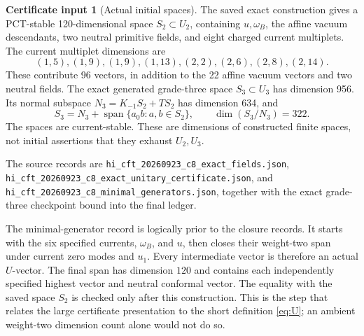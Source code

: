 \documentclass[11pt,a4paper]{article}
\theoremstyle{definition}
\newtheorem{certificate}[theorem]{Certificate input}
\DeclareMathOperator{\Span}{span}
\newcommand{\artifact}[1]{\textnormal{\nolinkurl{#1}}}
\begin{document}
\begin{certificate}[Actual initial spaces]\label{cert:initial}
The saved exact construction gives a PCT-stable 120-dimensional
space \(S_2\subset U_2\), containing \(u,\omega_B\), the affine
vacuum descendants, two neutral primitive fields, and eight charged
current multiplets. The current multiplet dimensions are
\[
 (1,5),(1,9),(1,9),(1,13),(2,2),(2,6),(2,8),(2,14).
\]
These contribute 96 vectors, in addition to the 22 affine vacuum
vectors and two neutral fields. The exact generated grade-three
space \(S_3\subset U_3\) has dimension 956. Its normal subspace
\(N_3=K_{-1}S_2+TS_2\) has dimension 634, and
\[
 S_3=N_3+\Span\{a_0b:a,b\in S_2\},\qquad \dim(S_3/N_3)=322.
\]
The spaces are current-stable. These are dimensions of constructed
finite spaces, not initial assertions that they exhaust \(U_2,U_3\).
\end{certificate}
The source records are
\artifact{hi_cft_20260923_c8_exact_fields.json},
\artifact{hi_cft_20260923_c8_exact_unitary_certificate.json}, and
\artifact{hi_cft_20260923_c8_minimal_generators.json}, together with
the exact grade-three checkpoint bound into the final ledger.

The minimal-generator record is logically prior to the closure records.
It starts with the six specified currents, $\omega_B$, and $u$, then
closes their weight-two span under current zero modes and $u_1$.
Every intermediate vector is therefore an actual $U$-vector. The final
span has dimension $120$ and contains each independently specified
highest vector and neutral conformal vector. The equality with the saved
space $S_2$ is checked only after this construction. This is the step
that relates the large certificate presentation to the short definition
\eqref{eq:U}; an ambient weight-two dimension count alone would not do so.
\end{document}
